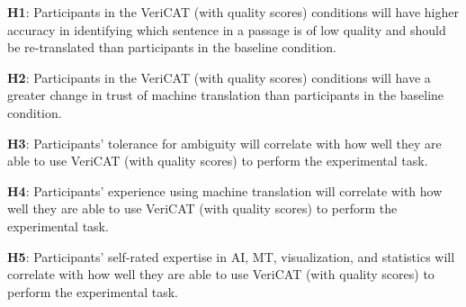 \begin{compacthang}
    \item \textbf{H1}: Participants in the VeriCAT (with quality scores) conditions will have higher accuracy in identifying which sentence in a passage is of low quality and should be re-translated than participants in the baseline condition. 
    \item \textbf{H2}: Participants in the VeriCAT (with quality scores) conditions will have a greater change in trust of machine translation than participants in the baseline condition. 
    \item \textbf{H3}: Participants’ tolerance for ambiguity will correlate with how well they are able to use VeriCAT (with quality scores) to perform the experimental task.
    \item \textbf{H4}: Participants’ experience using machine translation will correlate with how well they are able to use VeriCAT (with quality scores) to perform the experimental task.
    \item \textbf{H5}: Participants’ self-rated expertise in AI, MT, visualization, and statistics will correlate with how well they are able to use VeriCAT (with quality scores) to perform the experimental task.   
\end{compacthang}

